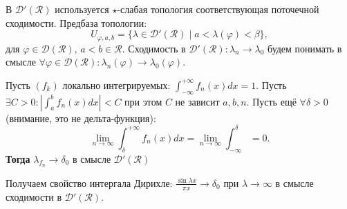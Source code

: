 \begin{to_def}
	В $\mathcal{D}'(\mathcal{R})$ используется $\star$-слабая топология соответствующая поточечной сходимости. Предбаза топологии:
	\begin{equation*}
		U_{\varphi,a,b} = \{\lambda \in \mathcal{D}'(\mathcal{R}) \mid a < \lambda(\varphi) < \beta\},
	\end{equation*}
	для $\varphi \in \mathcal{D}(\mathcal{R})$, $a< b \in \mathcal{R}$. Сходимость в $\mathcal{D}'(\mathcal{R}): \lambda_n \to \lambda_0$ будем понимать в смысле $\forall \varphi \in \mathcal{D}(\mathcal{R}): \lambda_n(\varphi) \to \lambda_0(\varphi)$.
\end{to_def}

\begin{to_thr}
	Пусть $(f_k)$ локально интегрируемых: $\int_{-\infty}^{+\infty} f_n(x) d x = 1$. Пусть $\exists C >0 \colon |\int_{a}^{b} f_n(x) d x|<C$ при этом $C$ не зависит $a,b,n$. Пусть ещё $\forall \delta>0$ (внимание, это не дельта-функция):
	\begin{equation*}
		\lim_{n \to \infty} \int_{\delta}^{+\infty} f_n(x) d x = \lim_{n \to \infty} \int_{-\infty}^{\delta} = 0.
	\end{equation*}
	\textbf{Тогда} $\lambda_{f_n} \to \delta_0$ в смысле $\mathcal{D}'(\mathcal{R})$
\end{to_thr}

\begin{to_suj}
	Получаем свойство интергала Дирихле: $\frac{\sin \lambda x}{\pi x} \to \delta_0$ при $\lambda \to \infty$ в смысле сходимости в $\mathcal{D}'(\mathcal{R})$.
\end{to_suj}